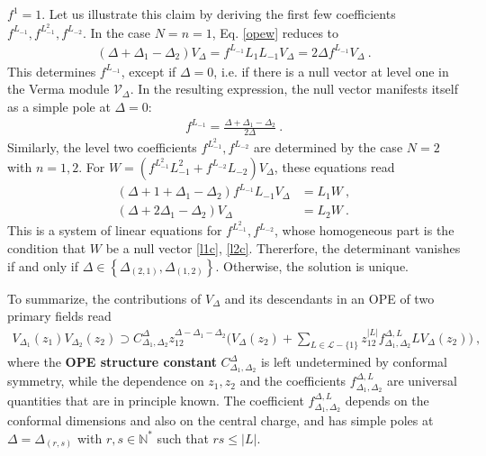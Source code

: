 \documentclass[12pt, a4paper]{article}
\theoremstyle{break}
\begin{document}
$f^{1}=1$. Let us illustrate this claim by deriving the first few coefficients $f^{L_{-1}},f^{L_{-1}^2},f^{L_{-2}}$. In the case $N=n=1$, Eq. \eqref{opew} reduces to
\begin{align}
 (\Delta+\Delta_1-\Delta_2)V_\Delta = f^{L_{-1}} L_1L_{-1}V_\Delta=2\Delta f^{L_{-1}}V_\Delta\ .
 \label{dddv}
\end{align}
This determines $f^{L_{-1}}$, except if $\Delta=0$, i.e. if there is a null vector at level one in the Verma module $\mathcal{V}_\Delta$. In the resulting expression, the null vector manifests itself as a simple pole at $\Delta=0$:
\begin{align}
 f^{L_{-1}} = \frac{\Delta+\Delta_1-\Delta_2}{2\Delta}\ . 
 \label{fl1}
\end{align}
Similarly, the level two coefficients $f^{L_{-1}^2},f^{L_{-2}}$ are determined by the case $N=2$ with $n=1,2$. For $W = \left(f^{L_{-1}^2}L_{-1}^2 + f^{L_{-2}}L_{-2}\right) V_\Delta$, these equations read 
\begin{align}
 (\Delta+1+\Delta_1-\Delta_2)f^{L_{-1}}L_{-1}V_\Delta  &= L_1W\ ,
 \label{el1c}
 \\
 (\Delta+2\Delta_1-\Delta_2)V_\Delta  &=L_2W \ .
 \label{el2c}
\end{align}
This is a system of linear equations for $f^{L_{-1}^2},f^{L_{-2}}$, whose homogeneous part is the condition that $W$ be a null vector \eqref{l1c}, \eqref{l2c}. Thererfore, the determinant vanishes if and only if $\Delta\in \left\{\Delta_{(2,1)},\Delta_{(1,2)}\right\}$. Otherwise, the solution is unique. 

To summarize, the contributions of $V_\Delta$ and its descendants in an OPE of two primary fields read
\begin{align}
 \boxed{V_{\Delta_1}(z_1)V_{\Delta_2}(z_2) \supset  C_{\Delta_1,\Delta_2}^{\Delta} z_{12}^{\Delta-\Delta_1-\Delta_2} \Bigg(V_\Delta(z_2) +\sum_{L\in \mathcal{L}-\{1\}}z_{12}^{|L|} f^{\Delta,L}_{\Delta_1,\Delta_2} LV_\Delta(z_2)\Bigg)}
 \ ,
 \label{prope}
\end{align}
where the \textbf{OPE structure constant} $C^\Delta_{\Delta_1,\Delta_2}$ is left undetermined by conformal symmetry, while the dependence on $z_1,z_2$ and the coefficients $f^{\Delta,L}_{\Delta_1,\Delta_2}$ are universal quantities that are in principle known. The coefficient $f^{\Delta,L}_{\Delta_1,\Delta_2}$ depends on the conformal dimensions and also on the central charge, and has simple poles at $\Delta=\Delta_{(r,s)}$ with $r,s\in\mathbb{N}^*$ such that $rs\leq |L|$. 
\end{document}
